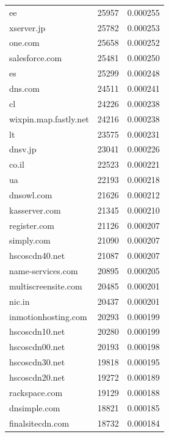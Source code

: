 \begin{tabular}{lrr}
ee & 25957 & 0.000255 \\
xserver.jp & 25782 & 0.000253 \\
one.com & 25658 & 0.000252 \\
salesforce.com & 25481 & 0.000250 \\
es & 25299 & 0.000248 \\
dns.com & 24511 & 0.000241 \\
cl & 24226 & 0.000238 \\
wixpin.map.fastly.net & 24216 & 0.000238 \\
lt & 23575 & 0.000231 \\
dnsv.jp & 23041 & 0.000226 \\
co.il & 22523 & 0.000221 \\
ua & 22193 & 0.000218 \\
dnsowl.com & 21626 & 0.000212 \\
kasserver.com & 21345 & 0.000210 \\
register.com & 21126 & 0.000207 \\
simply.com & 21090 & 0.000207 \\
hscoscdn40.net & 21087 & 0.000207 \\
name-services.com & 20895 & 0.000205 \\
multiscreensite.com & 20485 & 0.000201 \\
nic.in & 20437 & 0.000201 \\
inmotionhosting.com & 20293 & 0.000199 \\
hscoscdn10.net & 20280 & 0.000199 \\
hscoscdn00.net & 20193 & 0.000198 \\
hscoscdn30.net & 19818 & 0.000195 \\
hscoscdn20.net & 19272 & 0.000189 \\
rackspace.com & 19129 & 0.000188 \\
dnsimple.com & 18821 & 0.000185 \\
finalsitecdn.com & 18732 & 0.000184 \\
\bottomrule
\end{tabular}
